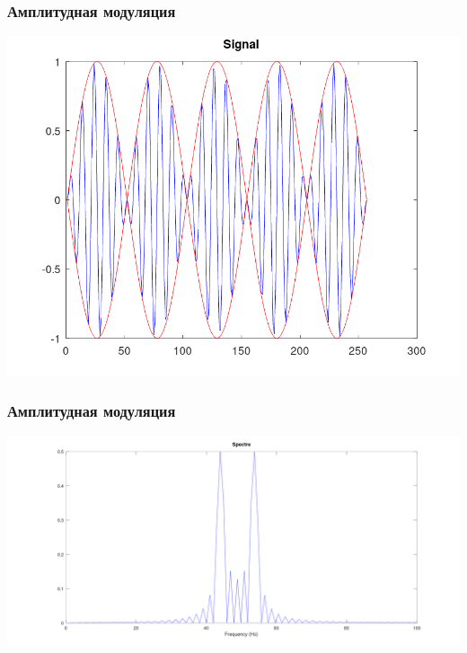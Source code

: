 \begin{frame}
\frametitle{Амплитудная модуляция}
            \includegraphics[width=\textwidth]{../octave/modulation/signal/am.png}
\end{frame}

\begin{frame}
\frametitle{Амплитудная модуляция}
            \includegraphics[width=\textwidth]{../octave/modulation/spectre/am.png}
\end{frame}

